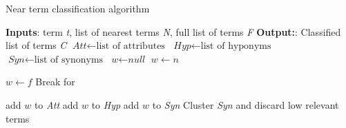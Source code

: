 \documentclass[Journal, InsideFigs, DoubleSpace]{ascelike} %
\begin{document}
\begin{algorithm}
	\caption{Near term classification algorithm}\label{euclid}
	\begin{algorithmic}[1]
		\State \textbf{Inputs}: term \textit{t}, list of nearest terms \textit{N}, full list of terms \textit{F}
		\State \textbf{Output:}: Classified list of terms \textit{C}
		\State $\textit{Att} \gets \text{list of attributes}$
		\State $\textit{Hyp} \gets \text{list of hyponyms}$
		\State $\textit{Syn} \gets \text{list of synonyms}$
		\State $\textit{w} \gets \textit{null}$
				\State $w \gets n$
	
			\Else
						\State $w \gets f$	
						\State Break for

					\EndIf
				\EndFor
			\EndIf
		\EndFor
			\State add $w$ to \textit{Att}
			\State add $w$ to \textit{Hyp}
		\Else
			\State add $w$ to \textit{Syn}
		\EndIf
		\State Cluster \textit{Syn} and discard low relevant terms

		\EndProcedure
	\end{algorithmic}
\end{algorithm}
\end{document}
